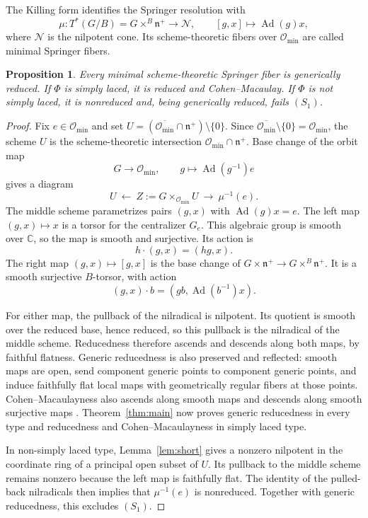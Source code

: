 \documentclass[12pt]{article}
\newtheorem{proposition}[theorem]{Proposition}
\theoremstyle{definition}
\DeclareMathOperator{\Ad}{Ad}
\newcommand{\C}{\mathbb C}
\newcommand{\n}{\mathfrak n^{+}}
\newcommand{\omin}{\mathcal O_{\min}}
\newcommand{\oc}{\overline{\mathcal O_{\min}}}
\begin{document}
The Killing form identifies the Springer resolution \cite[\S\S2.1, 2.10]{BM83} with
$$
    \mu:T^*(G/B)=G\times^B\n\longrightarrow\mathcal N,
    \qquad [g,x]\longmapsto\Ad(g)x,
$$
where $\mathcal N$ is the nilpotent cone. Its scheme-theoretic fibers over $\omin$ are called minimal Springer fibers.

\begin{proposition}\label{prop:springer}
    Every minimal scheme-theoretic Springer fiber is generically reduced. If $\Phi$ is simply laced, it is reduced and Cohen--Macaulay. If $\Phi$ is not simply laced, it is nonreduced and, being generically reduced, fails $(S_1)$.
\end{proposition}

\begin{proof}
    Fix $e\in\omin$ and set $U=(\oc\cap\n)\setminus\{0\}$. Since $\oc\setminus\{0\}=\omin$, the scheme $U$ is the scheme-theoretic intersection $\omin\cap\n$. Base change of the orbit map
    $$
        G\longrightarrow\omin,\qquad g\longmapsto\Ad(g^{-1})e
    $$
    gives a diagram
    $$
        U\ \longleftarrow\ Z:=G\times_{\omin}U\ \longrightarrow\ \mu^{-1}(e).
    $$
    The middle scheme parametrizes pairs $(g,x)$ with $\Ad(g)x=e$. The left map $(g,x)\mapsto x$ is a torsor for the centralizer $G_e$. This algebraic group is smooth over $\C$, so the map is smooth and surjective. Its action is
    $$
        h\cdot(g,x)=(hg,x).
    $$
    The right map $(g,x)\mapsto[g,x]$ is the base change of $G\times\n\to G\times^B\n$. It is a smooth surjective $B$-torsor, with action
    $$
        (g,x)\cdot b=(gb,\Ad(b^{-1})x).
    $$

    For either map, the pullback of the nilradical is nilpotent. Its quotient is smooth over the reduced base, hence reduced, so this pullback is the nilradical of the middle scheme. Reducedness therefore ascends and descends along both maps, by faithful flatness. Generic reducedness is also preserved and reflected: smooth maps are open, send component generic points to component generic points, and induce faithfully flat local maps with geometrically regular fibers at those points. Cohen--Macaulayness also ascends along smooth maps and descends along smooth surjective maps \cite[Tag~045J]{Stacks}. Theorem~\ref{thm:main} now proves generic reducedness in every type and reducedness and Cohen--Macaulayness in simply laced type.

    In non-simply laced type, Lemma~\ref{lem:short} gives a nonzero nilpotent in the coordinate ring of a principal open subset of $U$. Its pullback to the middle scheme remains nonzero because the left map is faithfully flat. The identity of the pulled-back nilradicals then implies that $\mu^{-1}(e)$ is nonreduced. Together with generic reducedness, this excludes $(S_1)$.
\end{proof}
\end{document}
